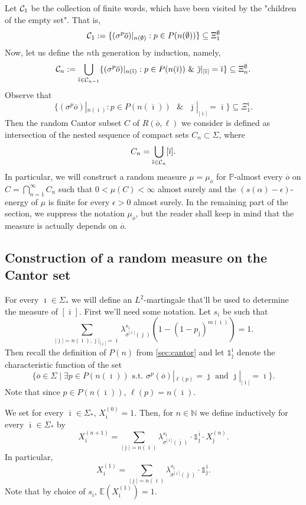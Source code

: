 \documentclass[12pt,]{article}
\theoremstyle{definition}
\theoremstyle{remark}
\renewcommand{\Bbb}[1]{\mathbb{#1}}
\newcommand{\bbE}{{\Bbb E}}
\newcommand{\bbN}{{\Bbb N}}         %
\newcommand{\bbP}{{\Bbb P}}
\newcommand{\cC}{{\cal C}}
\newcommand{\0}{\mathbf{0}}
\newcommand{\bi}{{\overline {\imath}}}
\newcommand{\bj}{{\overline  {\jmath}}}
\newcommand{\bo}{{\overline o}}
\begin{document}
Let $\cC_1$ be the collection of finite words, which have been visited by the "children of the empty set". That is,
$$
\cC_1:=\{(\sigma^p\bo)|_{n(\emptyset)} :p\in P(n(\emptyset))\}\subseteq\Xi_1^\emptyset
$$
Now, let us define the $n$th generation by induction, namely,
$$
\cC_n:=\bigcup_{\bi\in\cC_{n-1}}\{(\sigma^p\bo)|_{n(\bi)} :p\in P(n(\bi))\text{ }\&\text{
}\bj|_{|\bi|}=\bi\}\subseteq\Xi_n^\emptyset.
$$
Observe that
$$
\{(\sigma^p\bo)|_{n(\bi)} :p\in P(n(\bi))\text{ }\&\text{ }\bj|_{|\bi|}=\bi\}\subseteq\Xi_1^\bi.
$$
Then the random Cantor subset $C$ of $R(\bo,\ell)$ we consider is defined as intersection of the
nested sequence of compact sets $C_n\subset\Sigma$, where
\[
  C_{n}=\bigcup _{\bi\in\cC_n}[\bi].
\]
In particular, we will construct a random measure $\mu=\mu_{\bo}$ for $\bbP$-almost every  $\bo$ on
$C=\bigcap_{n=1}^\infty C_n$ such that $0<\mu(C)<\infty$ almost surely and the
$(s(\alpha)-\epsilon)$-energy of $\mu$ is finite for every $\epsilon>0$ almost surely. In the
remaining part of the section, we suppress the notation $\mu_\bo$, but the reader shall keep in mind
that the measure is actually depends on $\bo$. 


\subsection{Construction of a random measure on the Cantor set}

For every $\bi\in \Sigma_*$ we will define an $L^2$-martingale that'll be used to determine the
measure of $[\bi]$. First we'll need some notation. Let $s_\bi$ be such that
\[
  \sum_{|\bj|=n(\bi), \bj|_{|\bi|}=\bi}\lambda^{s_\bi}_{\sigma^{|\bi|}(\bj)}(1-(1-p_\bj)^{m(\bi)})=1.
\]
Then recall the definition of $P(n)$ from \cref{sec:cantor} and let $\mathbb 1_{\bj}^\bi$ denote the
characteristic function of the set
\[
  \{\bo\in \Sigma\mid \exists p\in P(n(\bi))\text{ s.t. }\sigma^p(\bo)|_{\ell(p)}=\bj\text{ and }\bj|_{|\bi|}=\bi\}.
\]
Note that since $p\in P(n(\bi))$, $\ell(p)=n(\bi)$.

We set for every $\bi\in\Sigma_*$, $X_\bi^{(0)}=1$. Then, for $n\in \bbN$ we define inductively for
every $\bi\in\Sigma_*$ by
\[
  X_{\bi}^{(n+1)}=\sum_{|\bj|=n(\bi)}\lambda^{s_\bi}_{\sigma^{|\bi|}(\bj)}\cdot\mathbb 1^\bi_\bj\cdot X_\bj^{(n)}.
\]
In particular,
\[
  X_{\bi}^{(1)}=\sum_{|\bj|=n(\bi)}\lambda^{s_{\bi}}_{\sigma^{|\bi|}(\bj)}\cdot\mathbb 1^\bi_\bj.
\]
Note that by choice of $s_{\bi}$, $\bbE ( X_\bi^{(1)})=1$.
\end{document}
